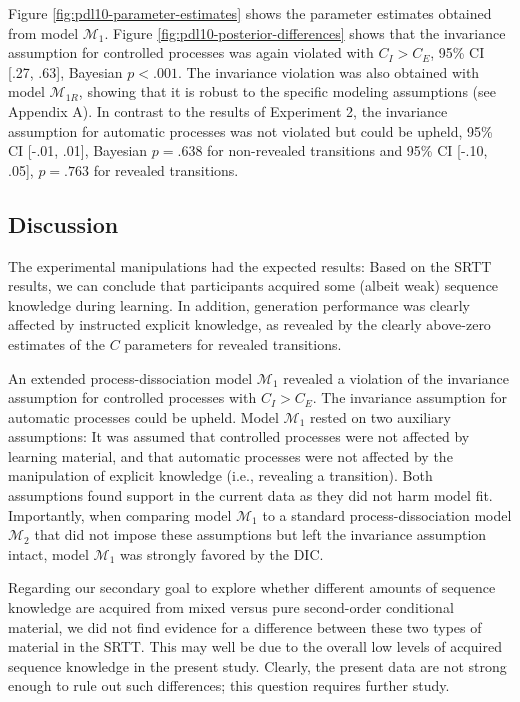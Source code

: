 \documentclass[english,,man]{apa6}
\begin{document}
Figure \ref{fig:pdl10-parameter-estimates} shows the parameter estimates obtained from model \(\mathcal{M}_1\).
Figure \ref{fig:pdl10-posterior-differences} shows that the invariance assumption for controlled processes was again violated with \(C_I > C_E\), 95\% CI {[}.27, .63{]}, Bayesian \(p < .001\).
The invariance violation was also obtained with model \(\mathcal{M}_{1R}\), showing that it is robust to the specific modeling assumptions (see Appendix A).
In contrast to the results of Experiment 2, the invariance assumption for automatic processes was not violated but could be upheld, 95\% CI {[}-.01, .01{]}, Bayesian \(p = .638\) for non-revealed transitions and 95\% CI {[}-.10, .05{]}, \(p = .763\) for revealed transitions.

\hypertarget{discussion-2}{%
\subsection{Discussion}\label{discussion-2}}

The experimental manipulations had the expected results:
Based on the SRTT results, we can conclude that participants acquired some (albeit weak) sequence knowledge during learning.
In addition, generation performance was clearly affected by instructed explicit knowledge, as revealed by the clearly above-zero estimates of the \(C\) parameters for revealed transitions.

An extended process-dissociation model \(\mathcal{M}_1\) revealed a violation of the invariance assumption for controlled processes with \(C_I > C_E\).
The invariance assumption for automatic processes could be upheld.
Model \(\mathcal{M}_1\) rested on two auxiliary assumptions:
It was assumed that controlled processes were not affected by learning material, and that automatic processes were not affected by the manipulation of explicit knowledge (i.e., revealing a transition).
Both assumptions found support in the current data as they did not harm model fit.
Importantly, when comparing model \(\mathcal{M}_1\) to a standard process-dissociation model \(\mathcal{M}_2\) that did not impose these assumptions but left the invariance assumption intact, model \(\mathcal{M}_1\) was strongly favored by the DIC.

Regarding our secondary goal to explore whether different amounts of sequence knowledge are acquired from mixed versus pure second-order conditional material,
we did not find evidence for a difference between these two types of material in the SRTT.
This may well be due to the overall low levels of acquired sequence knowledge in the present study.
Clearly, the present data are not strong enough to rule out such differences; this question requires further study.
\end{document}

